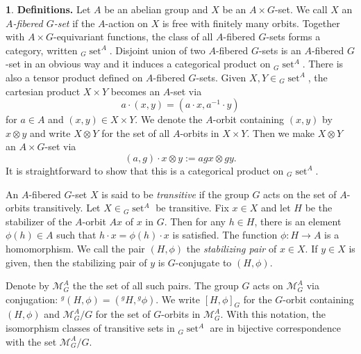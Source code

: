 \documentclass[12pt]{article}
\theoremstyle{plain}
\theoremstyle{definition}
\newtheorem{nothing}[theorem]{}
\newcommand{\GsetA}{{}_G\operatorname{set}^A}
\begin{document}
\begin{nothing}{\bf Definitions.}
Let $A$ be an abelian group and $X$ be an  $A\times G$-set. We call $X$ an {\it $A$-fibered $G$-set} if the $A$-action on $X$ is free with finitely many orbits. Together with $A\times G$-equivariant functions, the class of all $A$-fibered $G$-sets forms a category, written ${}_G\operatorname{set}^A$. Disjoint union of two $A$-fibered $G$-sets is an $A$-fibered $G$-set in an obvious way and it induces a categorical product on $\GsetA$. There is also a tensor product defined on $A$-fibered $G$-sets. Given $X, Y\in \GsetA$, the cartesian product $X\times Y$ becomes an $A$-set via 
\[ 
a\cdot (x, y) = (a\cdot x, a^{-1}\cdot y)
\] 
for $a\in A$ and $(x, y)\in X\times Y$. We denote the $A$-orbit containing $(x, y)$ by $x\otimes y$ and write $X\otimes Y$ for the set of all $A$-orbits in $X\times Y$. Then we make $X\otimes Y$ an $A\times G$-set via 
\[ 
(a, g)\cdot x\otimes y := agx\otimes gy.
\] 
It is straightforward to show that this is a categorical product on $\GsetA$. 

An $A$-fibered $G$-set $X$ is said to be \textit{transitive} if the group $G$ acts on the set of $A$-orbits transitively. Let $X\in\GsetA$ be transitive. Fix $x\in X$  and let $H$ be the stabilizer of the $A$-orbit $Ax$ of $x$ in $G$.  Then for any $h\in H$, there is an element $\phi(h)\in A$ such that $h\cdot x = \phi(h)\cdot x$ is satisfied. The function $\phi\colon H\to A$ is a homomorphism. We call the pair $(H, \phi)$ the \textit{stabilizing pair} of $x\in X$. If $y\in X$ is given, then the stabilizing pair of $y$ is $G$-conjugate to $(H, \phi)$.

Denote by $\mathcal M_G^A$ the the set of all such pairs. The group $G$ acts on $\mathcal M_G^A$ via conjugation: ${}^g(H, \phi) = ({}^gH, {}^g\phi)$. We write $[H, \phi]_G$ for the $G$-orbit containing $(H, \phi)$ and $\mathcal M_G^A/G$ for the set of $G$-orbits in $\mathcal M_G^A$. With this notation, the isomorphism classes of transitive sets in $\GsetA$ are in bijective correspondence with the set $\mathcal M_G^A/G$.
\end{nothing}
\end{document}
